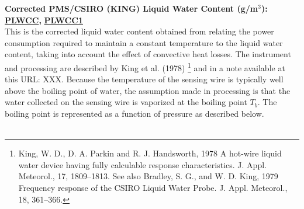 \begin{hangparagraphs}
\textbf{Corrected PMS/CSIRO (KING) Liquid Water Content (g/m$^{3}$):
}\textbf{\uline{PLWCC}}\textbf{,
}\textbf{\uline{PLWCC1}}\\
This is the corrected liquid water content
obtained from relating the power consumption required to maintain
a constant temperature to the liquid water content, taking into account
the effect of convective heat losses. The instrument and processing
are described by King et al. (1978)%
\footnote{King, W. D., D. A. Parkin and R. J. Handsworth, 1978 A hot-wire liquid
water device having fully calculable response characteristics. J.
Appl. Meteorol., 17, 1809--1813. See also Bradley, S. G., and W. D.
King, 1979 Frequency response of the CSIRO Liquid Water Probe. J.
Appl. Meteorol., 18, 361--366.%
} and in a note available at this URL: XXX. Because the temperature
of the sensing wire is typically well above the boiling point of water,
the assumption made in processing is that the water collected on the
sensing wire is vaporized at the boiling point $T_{b}$. The boiling
point is represented as a function of pressure as described below.
 \\
\\
\end{hangparagraphs}
